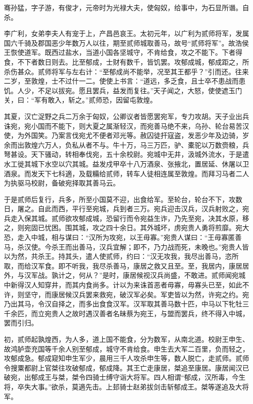 \documentclass[12pt,UTF8]{ctexbook}
\begin{document}
骞孙猛，字子游，有俊才，元帝时为光禄大夫，使匈奴，给事中，为石显所谮。自杀。



李广利，女弟李夫人有宠于上，产昌邑哀王。太初元年，以广利为贰师将军，发属国六千骑及郡国恶少年数万人以往，期至贰师城取善马，故号“贰师将军”。故浩侯王恢使道军。既西过盐水，当道小国各坚城守，不肯给食，攻之不能下。下者得食，不下者数日则去。比至郁成，士财有数千，皆饥罢。攻郁成城，郁成距之，所杀伤甚众。贰师将军与左右计：“至郁成尚不能举，况至其王都乎？”引而还。往来二岁，至敦煌，士不过什一二。使使上书言：“道远，多乏食，且士卒不患战而患饥。人少，不足以拔宛。愿且罢兵，益发而复往。”天子闻之，大怒，使使遮玉门关，曰：“军有敢入，斩之。”贰师恐，因留屯敦煌。



其夏，汉亡浞野之兵二万余于匈奴，公卿议者皆愿罢宛军，专力攻胡。天子业出兵诛宛，宛小国而不能下，则大夏之属渐轻汉，而宛善马绝不来，乌孙、轮台易苦汉使，为外国笑。乃案言伐宛尤不便者邓光等。赦囚徒扞寇盗，发恶少年及边骑，岁余而出敦煌六万人，负私从者不与。牛十万，马三万匹，驴、橐驼以万数赍粮，兵弩甚设。天下骚动，转相奉伐宛，五十余校尉。宛城中无井，汲城外流水，于是遣水工徙其城下水空以穴其城。益发戍甲卒十八万酒泉、张掖北，置居延、休屠以卫酒泉。而发天下七科適，及载糒给贰师，转车人徒相连属至敦煌。而拜习马者二人为执驱马校尉，备破宛择取其善马云。



于是贰师后复行，兵多，所至小国莫不迎，出食给军。至轮台，轮台不下，攻数日，屠之。自此而西，平行至宛城，兵到者三万。宛兵迎击汉兵，汉兵射败之，宛兵走入保其城。贰师欲攻郁成城，恐留行而令宛益生诈，乃先至宛，决其水原，移之，则宛固已忧困。围其城，攻之四十余日。其外城坏，虏宛贵人勇将煎靡。宛大恐，走入中城，相与谋曰：“汉所为攻宛，以王毋寡。”宛贵人谋曰：“王毋寡匿善马，杀汉使。今杀王而出善马，汉兵宜解；即不，乃力战而死，未晚也。”宛贵人皆以为然，共杀王。持其头，遣人使贰师，约曰：“汉无攻我，我尽出善马，恣所取，而给汉军食。即不听我，我尽杀善马，康居之救又且至。至，我居内，康居居外，与汉军战。孰计之，何从？”是时，康居候视汉兵尚盛，不敢进。贰师闻宛城中新得汉人知穿井，而其内食尚多。计以为来诛首恶者毋寡，毋寡头已至，如此不许，则坚守，而康居候汉兵罢来救宛，破汉军必矣。军吏皆以为然，许宛之约。宛乃出其马，令汉自择之，而多出食食汉军。汉军取其善马数十匹，中马以下牝牡三千余匹，而立宛贵人之故时遇汉善者名昧蔡为宛王，与盟而罢兵，终不得入中城，罢而引归。



初，贰师起孰煌西，为人多，道上国不能食，分为数军，从南北道。校尉王申生、故鸿胪壶充国等千余人别至郁成，城守不肯给食。申生去大军二百里，负而轻之，攻郁成急。郁成窥知申生军少，晨用三千人攻杀申生等，数人脱亡，走贰师。贰师令搜粟都尉上官桀往攻破郁成，郁成降。其王亡走康居，桀追至康居。康居闻汉已破宛，出郁成王与桀，桀令四骑士缚守诣大将军。四人相谓“郁成，汉所毒，今生将，卒失大事。”欲杀，莫適先击。上邽骑士赵弟拔剑击斩郁成王。桀等遂追及大将军。
\end{document}
